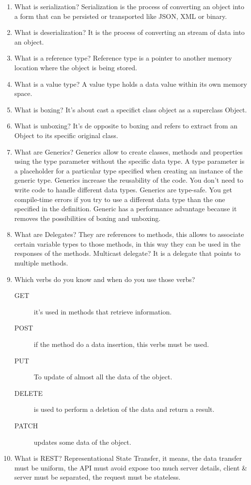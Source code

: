 \begin{multicols}{2}
\begin{enumerate}
\item What is serialization? Serialization is the process of converting an object into a form that can be persisted or transported like JSON, XML or binary.
\item What is deserialization? It is the process of converting an stream of data into an object.
\item What is a reference type? Reference type is a pointer to another memory location where the object is being stored.
\item What is a value type? A value type holds a data value within its own memory space.
\item What is boxing? It's about cast a specifict class object as a superclass Object.
\item What is unboxing? It's de opposite to boxing and refers to extract from an Object to its specific original class.
\item What are Generics? Generics allow to create classes, methods and properties using the type parameter without the specific data type. A type parameter is a placeholder for a particular type specified when creating an instance of the generic type. Generics increase the reusability of the code. You don't need to write code to handle different data types. Generics are type-safe. You get compile-time errors if you try to use a different data type than the one specified in the definition.
Generic has a performance advantage because it removes the possibilities of boxing and unboxing.
\item What are Delegates? They are references to methods, this allows to associate certain variable types to those methods, in this way they can be used in the responses of the methods. Multicast delegate? It is a delegate that points to multiple methods.
\item Which verbs do you know and when do you use those verbs?
\begin{description}
\item[GET] it's used in methods that retrieve information.
\item[POST] if the method do a data insertion, this verbs must be used.
\item[PUT] To update of almost all the data of the object.
\item[DELETE] is used to perform a deletion of the data and return a result.
\item[PATCH] updates some data of the object.
\end{description}
\item What is REST? Representational State Transfer, it means, the data transfer must be uniform, the API must avoid expose too much server details, client \& server must be separated, the request must be stateless.

\end{enumerate}
\end{multicols}
